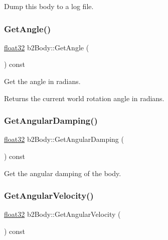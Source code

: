 Dump this body to a log file. 

\mbox{\label{classb2_body_a20b9c8d0d722edf3af281034d37bd534}} 
\subsubsection{\texorpdfstring{GetAngle()}{GetAngle()}}
{\footnotesize\ttfamily \mbox{\hyperlink{b2_settings_8h_aacdc525d6f7bddb3ae95d5c311bd06a1}{float32}} b2\+Body\+::\+Get\+Angle (\begin{DoxyParamCaption}{ }\end{DoxyParamCaption}) const\hspace{0.3cm}{\ttfamily [inline]}}

Get the angle in radians. \begin{DoxyReturn}{Returns}
the current world rotation angle in radians. 
\end{DoxyReturn}
\mbox{\label{classb2_body_a151f5e81e44037883f61b67821704999}} 
\subsubsection{\texorpdfstring{GetAngularDamping()}{GetAngularDamping()}}
{\footnotesize\ttfamily \mbox{\hyperlink{b2_settings_8h_aacdc525d6f7bddb3ae95d5c311bd06a1}{float32}} b2\+Body\+::\+Get\+Angular\+Damping (\begin{DoxyParamCaption}{ }\end{DoxyParamCaption}) const\hspace{0.3cm}{\ttfamily [inline]}}



Get the angular damping of the body. 

\mbox{\label{classb2_body_a6a404d85efc510f43575f61cb95c07a7}} 
\subsubsection{\texorpdfstring{GetAngularVelocity()}{GetAngularVelocity()}}
{\footnotesize\ttfamily \mbox{\hyperlink{b2_settings_8h_aacdc525d6f7bddb3ae95d5c311bd06a1}{float32}} b2\+Body\+::\+Get\+Angular\+Velocity (\begin{DoxyParamCaption}{ }\end{DoxyParamCaption}) const\hspace{0.3cm}{\ttfamily [inline]}}

